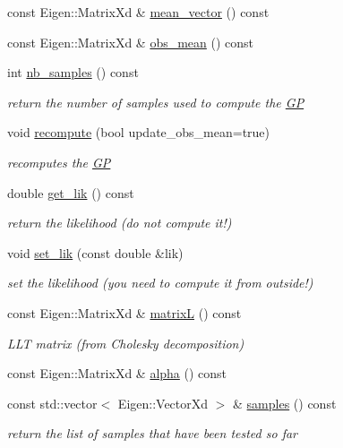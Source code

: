 \begin{DoxyCompactItemize}
const Eigen\+::\+Matrix\+Xd \& \hyperlink{classlimbo_1_1model_1_1_g_p_ade0d93b847e3d112735b3e8143470a55}{mean\+\_\+vector} () const 
\item 
const Eigen\+::\+Matrix\+Xd \& \hyperlink{classlimbo_1_1model_1_1_g_p_aa9d3799fdcd71a8ccc19bc43932fa321}{obs\+\_\+mean} () const 
\item 
int \hyperlink{classlimbo_1_1model_1_1_g_p_ac490915c95cc78f6cd836f78e3638bf1}{nb\+\_\+samples} () const 
\begin{DoxyCompactList}\small\item\em return the number of samples used to compute the \hyperlink{classlimbo_1_1model_1_1_g_p}{G\+P} \end{DoxyCompactList}\item 
void \hyperlink{classlimbo_1_1model_1_1_g_p_a55ea6fe353a12d4c788fac5f2e20e416}{recompute} (bool update\+\_\+obs\+\_\+mean=true)
\begin{DoxyCompactList}\small\item\em recomputes the \hyperlink{classlimbo_1_1model_1_1_g_p}{G\+P} \end{DoxyCompactList}\item 
double \hyperlink{classlimbo_1_1model_1_1_g_p_a794ed0eeda29aaa7afe303b5e72d3927}{get\+\_\+lik} () const 
\begin{DoxyCompactList}\small\item\em return the likelihood (do not compute it!) \end{DoxyCompactList}\item 
void \hyperlink{classlimbo_1_1model_1_1_g_p_a4dfc1807eb4f113191dbd3ae51c053ee}{set\+\_\+lik} (const double \&lik)
\begin{DoxyCompactList}\small\item\em set the likelihood (you need to compute it from outside!) \end{DoxyCompactList}\item 
const Eigen\+::\+Matrix\+Xd \& \hyperlink{classlimbo_1_1model_1_1_g_p_a6f3a88531cc874a3a0cae0c218b0cf0a}{matrix\+L} () const 
\begin{DoxyCompactList}\small\item\em L\+L\+T matrix (from Cholesky decomposition) \end{DoxyCompactList}\item 
const Eigen\+::\+Matrix\+Xd \& \hyperlink{classlimbo_1_1model_1_1_g_p_adab606218ab9ef0c35babf8d1cc16d81}{alpha} () const 
\item 
const std\+::vector$<$ Eigen\+::\+Vector\+Xd $>$ \& \hyperlink{classlimbo_1_1model_1_1_g_p_abaa15a2e503bac670dd1a35fb377aa23}{samples} () const 
\begin{DoxyCompactList}\small\item\em return the list of samples that have been tested so far \end{DoxyCompactList}\end{DoxyCompactItemize}


